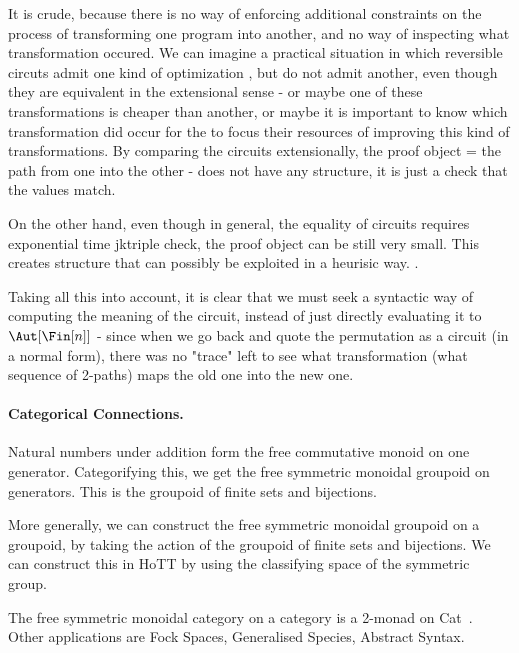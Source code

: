 It is crude, because there is no way of enforcing additional constraints on the
process of transforming one program into another, and no way of inspecting what
transformation occured. We can imagine a practical situation in which reversible
circuts admit one kind of optimization , but do not admit another,
even though they are equivalent in the extensional sense - or maybe one of these
transformations is cheaper than another, or maybe it is important to know which
transformation did occur for the  to focus their resources of
improving this kind of transformations. By comparing the circuits extensionally,
the proof object = the path from one into the other - does not have any
structure,  it is just a check that the values match.

On the other hand, even though in general, the equality of circuits requires
exponential time jk{triple check}, the proof object can be still very small.
This creates structure that can possibly be exploited in a heurisic way.
.

Taking all this into account, it is clear that we must seek a syntactic way of
computing the meaning of the circuit, instead of just directly evaluating it to
$\Aut[\Fin[n]]$ - since when we go back and quote the permutation as a circuit
(in a normal form), there was no "trace" left to see what transformation (what
sequence of 2-paths) maps the old one into the new one.


\paragraph*{Categorical Connections.}

Natural numbers under addition form the free commutative monoid on one generator. Categorifying this, we get the free
symmetric monoidal groupoid on generators. This is the groupoid of finite sets and bijections.

More generally, we can construct the free symmetric monoidal groupoid on a groupoid, by taking the action of the
groupoid of finite sets and bijections. We can construct this in HoTT by using the classifying space of the symmetric
group.

The free symmetric monoidal category on a category is a 2-monad on
Cat~\cite{blackwellTwodimensionalMonadTheory1989,abramskyAbstractScalarsLoops2005,leinsterHigherOperadsHigher2004}.
Other applications are Fock Spaces, Generalised Species, Abstract Syntax.

